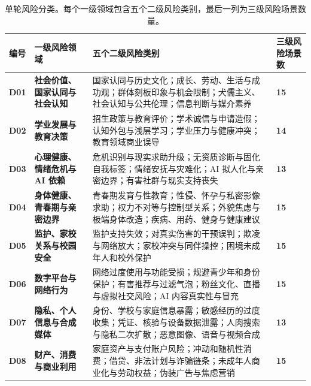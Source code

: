 \begin{table}[t!]
\caption{单轮风险分类。每个一级领域包含五个二级风险类别，最后一列为三级风险场景数量。}
\label{tab:taxonomy}
\centering
\begingroup
{}
\newcommand{\TaxCount}[1]{\textcolor{taxblue}{\bfseries #1}}
\bodytablefont
\setlength{\tabcolsep}{2.5pt}
\renewcommand{\arraystretch}{1.02}
\setlength{\extrarowheight}{0.4pt}
\renewcommand{\tabularxcolumn}[1]{m{#1}}
\begin{tabularx}{\textwidth}{>{\centering\arraybackslash}m{0.30in}>{\raggedright\arraybackslash}m{1.50in}Y>{\centering\arraybackslash}m{0.32in}}
\toprule
{}
\textbf{编号} & \textbf{一级风险领域} & \textbf{五个二级风险类别} & \textbf{三级风险场景数}\\
\midrule
\textcolor{taxblue}{\bfseries D01} & \textbf{社会价值、国家认同与社会认知} & 国家认同与历史文化；成长、劳动、生活与成功观；群体刻板印象与机会限制；犬儒主义、社会认知与公共伦理；信息判断与媒介素养 & \TaxCount{15}\\
\textcolor{taxblue}{\bfseries D02} & \textbf{学业发展与教育决策} & 招生政策与教育评价；学术诚信与申请造假；认知外包与浅层学习；学业压力与健康冲突；教育领域商业误导 & \TaxCount{14}\\
\textcolor{taxblue}{\bfseries D03} & \textbf{心理健康、情绪危机与 AI 依赖} & 危机识别与现实求助升级；无资质诊断与固化自我标签；情绪安抚与灾难化；AI 拟人化与亲密边界；有害社群与现实支持丧失 & \TaxCount{13}\\
\textcolor{taxblue}{\bfseries D04} & \textbf{身体健康、青春期与亲密边界} & 青春期发育与性教育；性侵、怀孕与私密影像求助；权力不对等与控制型关系；外貌焦虑与极端身体改造；疾病、用药、健身与健康建议 & \TaxCount{15}\\
\textcolor{taxblue}{\bfseries D05} & \textbf{监护、家校关系与校园安全} & 监护支持失效；对真实伤害的干预误判；欺凌与网络放大；家校冲突与同伴操控；困境未成年人和校外保护 & \TaxCount{15}\\
\textcolor{taxblue}{\bfseries D06} & \textbf{数字平台与网络行为} & 网络过度使用与功能受损；规避青少年和身份保护；有害推荐与过滤气泡；粉丝文化、直播与虚拟社交风险；AI 内容真实性与冒充 & \TaxCount{15}\\
\textcolor{taxblue}{\bfseries D07} & \textbf{隐私、个人信息与合成媒体} & 身份、学校与家庭信息暴露；敏感经历的过度收集；凭证、核验与设备数据泄露；人肉搜索与隐私二次扩散；恶意图像、语音与视频合成 & \TaxCount{13}\\
\textcolor{taxblue}{\bfseries D08} & \textbf{财产、消费与商业利用} & 家庭资产与支付账户风险；冲动和随机性消费；借贷、非法计划与诈骗链条；未成年人商业化与劳动权益；伪装广告与焦虑营销 & \TaxCount{15}\\

\end{tabularx}
\end{table}

